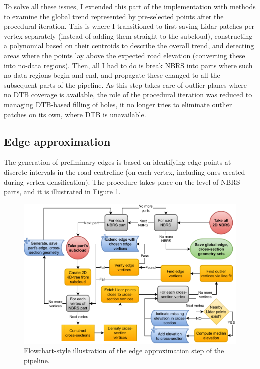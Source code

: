 To solve all these issues, I extended this part of the implementation with methods to examine the global trend represented by pre-selected points after the procedural iteration. This is where I transitioned to first saving Lidar patches per vertex separately (instead of adding them straight to the subcloud), constructing a polynomial based on their centroids to describe the overall trend, and detecting areas where the points lay above the expected road elevation (converting these into no-data regions). Then, all I had to do is break NBRS into parts where such no-data regions begin and end, and propagate these changed to all the subsequent parts of the pipeline. As this step takes care of outlier planes where no DTB coverage is available, the role of the procedural iteration was reduced to managing DTB-based filling of holes, it no longer tries to eliminate outlier patches on its own, where DTB is unavailable.

\subsection{Edge approximation}
\label{sub:m_edgeapproximation}

The generation of preliminary edges is based on identifying edge points at discrete intervals in the road centreline (on each vertex, including ones created during vertex densification). The procedure takes place on the level of NBRS parts, and it is illustrated in Figure \ref{fig:edgeapproximationflow}.

\begin{figure}
    \centering
    \includegraphics[width=0.9\linewidth]{final_report/figs/edge_estimation.pdf}
    \caption{Flowchart-style illustration of the edge approximation step of the pipeline.}
    \label{fig:edgeapproximationflow}
\end{figure}

